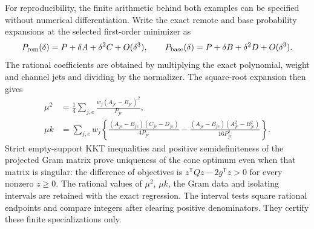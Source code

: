 For reproducibility, the finite arithmetic behind both examples can be
specified without numerical differentiation. Write the exact remote and
base probability expansions at the selected first-order minimizer as
\[
 P_{\rm rem}(\delta)=P+\delta A+\delta^2C+O(\delta^3),\qquad
 P_{\rm base}(\delta)=P+\delta B+\delta^2D+O(\delta^3).
\]
The rational coefficients are obtained by multiplying the exact polynomial,
weight and channel jets and dividing by the normalizer. The square-root
expansion then gives
\begin{align}
 \mu^2&=\frac14\sum_{j,e}\frac{w_j(A_{je}-B_{je})^2}{P_{je}},\nonumber\\
 \mu k&=\sum_{j,e}w_j\left\{
 \frac{(A_{je}-B_{je})(C_{je}-D_{je})}{4P_{je}}
 -\frac{(A_{je}-B_{je})(A_{je}^2-B_{je}^2)}{16P_{je}^2}
 \right\}.\label{eq:exact-second-coefficient}
\end{align}
Strict empty-support KKT inequalities and positive semidefiniteness of
the projected Gram matrix prove uniqueness of the cone optimum even
when that matrix is singular: the difference of objectives is
$z^{\mathsf T}Qz-2g^{\mathsf T}z>0$ for every nonzero $z\ge0$.
The rational values of $\mu^2$, $\mu k$, the Gram data and isolating
intervals are retained with the exact regression. The interval tests
square rational endpoints and compare integers after clearing positive
denominators. They certify these finite specializations only.
